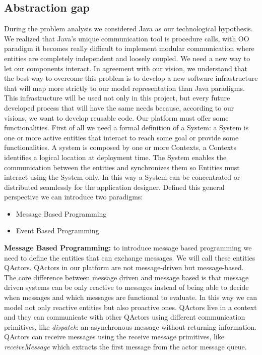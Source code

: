 \subsection{Abstraction gap}
During the problem analysis we considered Java as our technological hypothesis.
We realized that Java’s unique communication tool is procedure calls, with
OO paradigm it becomes really difficult to implement modular communication
where entities are completely independent and loosely coupled. We need a new
way to let our components interact. In agreement with our vision, we understand
that the best way to overcome this problem is to develop a new software
infrastructure that will map more strictly to our model representation than Java
paradigms. This infrastructure will be used not only in this project, but every
future developed process that will have the same needs because, according to
our visions, we want to develop reusable code.
Our platform must offer some functionalities. First of all we need a formal definition
of a System:
a System is one or more active entities that interact to reach some goal or provide
some functionalities. A system is composed by one or more Contexts, a Contexts
identifies a logical location at deployment time. The System enables the communication
between the entities and synchronizes them so Entities must interact
using the System only. In this way a System can be concentrated or distributed
seamlessly for the application designer. Defined this general perspective we can
introduce two paradigms:
\begin{itemize}
	\item Message Based Programming
	\item Event Based Programming
\end{itemize}
\textbf{Message Based Programming:} to introduce message based programming we
need to define the entities that can exchange messages. We will call these entities
QActors.
QActors in our platform are not message-driven but message-based. The core
difference between message driven and message based is that message driven
systems can be only reactive to messages instead of being able to decide when
messages and which messages are functional to evaluate. In this way we can
model not only reactive entities but also proactive ones. QActors live in a context
and they can communicate with other QActors using different communication
primitives, like \textit{dispatch}: an asynchronous message without returning information. \\
QActors can receive messages using the receive message primitives, like \textit{receiveMessage} which extracts the first message from the actor message queue. \\\\
